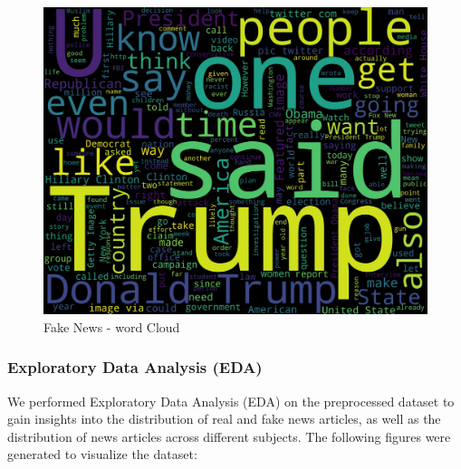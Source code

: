 \begin{figure}
    \centering
    \includegraphics[width=0.75\linewidth]{figures/fakenews_wordcloud.pdf}
    \caption{Fake News - word Cloud}
    \label{fig:enter-label}
\end{figure}
\subsubsection{{Exploratory Data Analysis (EDA)}}

We performed Exploratory Data Analysis (EDA) on the preprocessed dataset to gain insights into the distribution of real and fake news articles, as well as the distribution of news articles across different subjects. The following figures were generated to visualize the dataset:

 